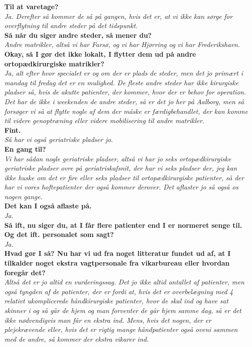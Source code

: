 \noindent
\textbf{Til at varetage?} \\
\noindent
\textit{Ja. Derefter så kommer de så på gangen, hvis det er, at vi ikke kan sørge for overflytning til andre steder på det tidspunkt.} \\
\noindent
\textbf{Så når du siger andre steder, så mener du?} \\
\noindent
\textit{Andre matrikler, altså vi har Farsø, og vi har Hjørring og vi har Frederikshavn.} \\
\noindent
\textbf{Okay, så I gør det ikke lokalt, I flytter dem ud på andre ortopædkirurgiske matrikler?} \\
\noindent
\textit{Ja, alt efter hvor specialet er og om der er plads de steder, men det jo primært i  mandag til fredag det er en mulighed. De fleste andre steder har ikke kirurgiske pladser så, hvis de akutte patienter, der kommer, hvor der er behov for operation. Det har de ikke i weekenden de andre steder, så er det jo her på Aalborg, men så forsøger vi så at flytte nogle af dem der måske er færdigbehandlet, der kan komme til videre genoptræning eller videre mobilisering til andre matrikler. } \\
\noindent
\textbf{Fint.} \\
\noindent
\textit{Så har vi også geriatriske pladser jo.} \\
\noindent
\textbf{En gang til?} \\
\noindent
\textit{Vi har sådan nogle geriatriske pladser, altså vi har jo seks ortopædkirurgiske geriatriske pladser ovre på geriatriskafsnit, der har vi seks pladser der, jeg kan ikke huske om det er fire eller seks pladser til ortopædkirurgiske patienter, så der har vi vores hoftepatienter der også kommer derover. Det aflaster jo så også os nogen gange.} \\
\noindent
\textbf{Det kan I også aflaste på.} \\
\noindent
\textit{Ja.} \\
\noindent
\textbf{Så ift, nu siger du, at I får flere patienter end I er normeret senge til. Og det ift. personalet som sagt?} \\
\noindent
\textit{Ja.} \\
\noindent
\textbf{Hvad gør I så? Nu har vi ud fra noget litteratur fundet ud af, at I tilkalder noget ekstra vagtpersonale fra vikarbureau eller hvordan foregår det?} \\
\noindent
\textit{Altså det er jo altid en vurderingssag. Det jo ikke altid antallet af patienter, men også tyngden af de patienter, der er fordi at, hvis det er overbelægning med 4 relativt ukomplicerede håndkirurgiske patienter, hvor de skal ind og have sat skinner i og så går de hjem og man forventer de går hjem samme dag, så er det ikke nødvendigvis man får en ekstra ind. Mens, hvis det nogen, der er plejekrævende eller, hvis det er rigtig mange håndpatienter også oveni sammen med de andre, så kommer der ekstra vikarer ind.}\\
